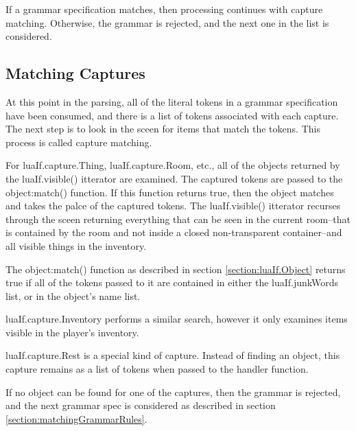 \documentclass{book}
\begin{document}
If a grammar specification matches, then processing continues with
capture matching. Otherwise, the grammar is rejected, and the next one
in the list is considered.

\subsection{Matching Captures}
\label{section:matchingCaptures}

At this point in the parsing, all of the literal tokens in a grammar
specification have been consumed, and there is a list of tokens
associated with each capture. The next step is to look in the sceen
for items that match the tokens. This process is called capture
matching.

For luaIf.capture.Thing, luaIf.capture.Room, etc., all of the objects
returned by the luaIf.visible() itterator are examined. The captured
tokens are passed to the object:match() function. If this function
returns true, then the object matches and takes the palce of the
captured tokens. The luaIf.visible() itterator recurses through the
sceen returning everything that can be seen in the current room--that
is contained by the room and not inside a closed non-transparent
container--and all visible things in the inventory.

The object:match() function as described in section
\ref{section:luaIf.Object} returns true if all of the tokens passed to
it are contained in either the luaIf.junkWords list, or in the
object's name list.

luaIf.capture.Inventory performs a similar search, however it only
examines items visible in the player's inventory.

luaIf.capture.Rest is a special kind of capture. Instead of finding an
object, this capture remains as a list of tokens when passed to the
handler function.

If no object can be found for one of the captures, then the grammar is
rejected, and the next grammar spec is considered as described in
section \ref{section:matchingGrammarRules}.
\end{document}
